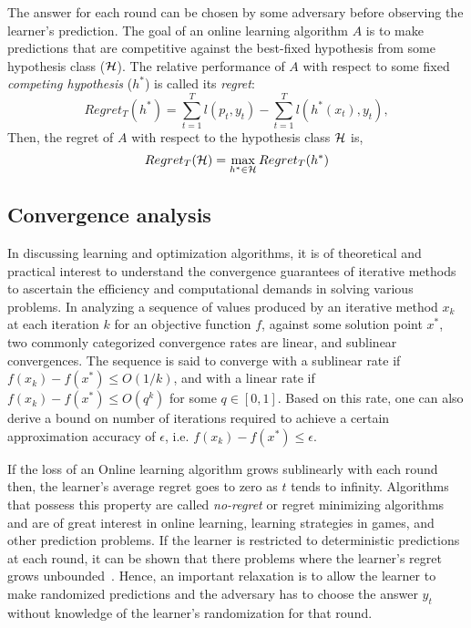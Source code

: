 The answer for each round can be chosen by some
adversary before observing the learner's prediction.
The goal of an online learning algorithm $A$ is to make predictions that are competitive against
the best-fixed hypothesis from some hypothesis class ($\mathcal{H}$).
The relative performance of $A$ with respect to some fixed \textit{competing hypothesis} ($h^\ast$)
is called its \textit{regret}:
\begin{equation}
	\label{eqn:regret} Regret_T(h^*) = \sum_{t=1}^T
	l(p_t, y_t) - \sum_{t=1}^T l(h^*(x_t), y_t),
\end{equation} Then, the regret of $A$ with respect to
the hypothesis class $\mathcal{H}$ is,
\begin{equation}
	\label{eqn:regret_all} Regret_T(\mathcal{H}) =
	\max_{h^* \in \mathcal{H}} Regret_T(h^*)
\end{equation}

\subsection{Convergence
	analysis} In discussing learning and optimization algorithms, it is of theoretical and practical
interest to understand the convergence guarantees of iterative methods to ascertain the efficiency
and computational demands in solving various problems.
In analyzing a sequence of values produced by an iterative method $x_k$ at each iteration $k$ for
an objective function $f$, against some solution point $x^{\ast}$, two commonly categorized
convergence rates are linear, and sublinear convergences.
The sequence is said to converge with a sublinear rate if $f(x_k) - f(x^\ast) \leq O(1/k)$, and
with a linear rate if $f(x_k) - f(x^\ast) \leq O(q^k)$ for some $q \in [0, 1]$.
Based on this rate, one can also derive a bound on number of iterations required to achieve a
certain approximation accuracy of $\epsilon$, i.e. $f(x_k) - f(x^\ast) \leq \epsilon$.

If the loss of an Online learning algorithm grows sublinearly with each round then, the learner's
average regret goes to zero as $t$ tends to infinity.
Algorithms that possess this property are called \textit{no-regret} or regret minimizing algorithms
and are of great interest in online learning, learning strategies in games, and other prediction
problems.
If the learner is restricted to deterministic predictions at each round, it can be shown that there
problems where the learner's regret grows unbounded~\cite{coverBehavior1965}.
Hence, an important relaxation is to allow the learner to make randomized predictions and the
adversary has to choose the answer $y_t$ without knowledge of the learner's randomization for that
round.

